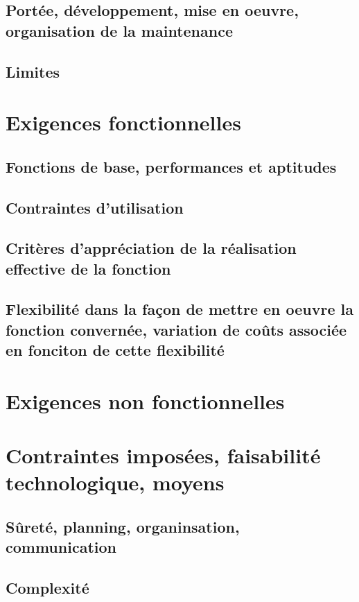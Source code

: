 \subsection{Portée, développement, mise en oeuvre, organisation de la maintenance}



\subsection{Limites}

\section{Exigences fonctionnelles}
\subsection{Fonctions de base, performances et aptitudes}
\subsection{Contraintes d'utilisation}
\subsection{Critères d'appréciation de la réalisation effective de la fonction}
\subsection{Flexibilité dans la façon de mettre en oeuvre la fonction convernée, variation de coûts associée en fonciton de cette flexibilité}

\section{Exigences non fonctionnelles}

\section{Contraintes imposées, faisabilité technologique, moyens}
\subsection{Sûreté, planning, organinsation, communication}
\subsection{Complexité}
